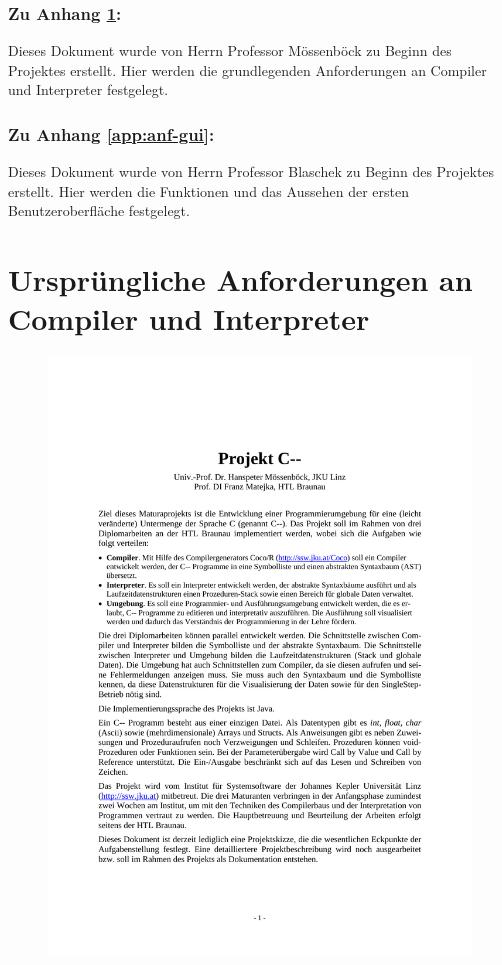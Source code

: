 \documentclass[11pt, oneside]{book}   		%
\begin{document}
\subsubsection*{Zu Anhang \ref{app:anf-comp}:}
Dieses Dokument wurde von Herrn Professor Mössenböck zu Beginn des Projektes erstellt. Hier werden die grundlegenden Anforderungen an Compiler und Interpreter festgelegt.

\subsubsection*{Zu Anhang \ref{app:anf-gui}:}
Dieses Dokument wurde von Herrn Professor Blaschek zu Beginn des Projektes erstellt. Hier werden die Funktionen und das Aussehen der ersten Benutzeroberfläche festgelegt.

\pagebreak
\section{Ursprüngliche Anforderungen an Compiler und Interpreter}
\label{app:anf-comp}

\begin{figure}[h!]
	\centering
	\includegraphics[width=1.0\textwidth]{./media/docs/Anforderung-compiler.pdf}
\end{figure}
\end{document}
